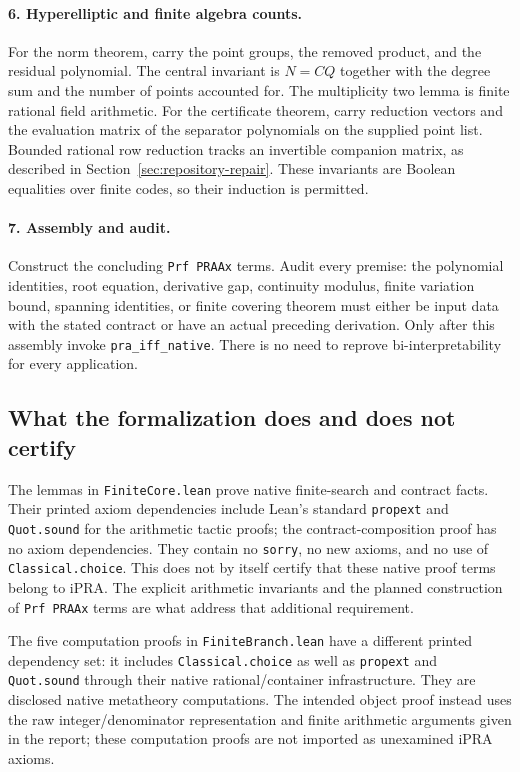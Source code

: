 \paragraph{6. Hyperelliptic and finite algebra counts.}
For the norm theorem, carry the point groups, the removed product, and
the residual polynomial. The central invariant is $N=CQ$ together with
the degree sum and the number of points accounted for. The multiplicity
two lemma is finite rational field arithmetic. For the certificate
theorem, carry reduction vectors and the evaluation matrix of the
separator polynomials on the supplied point list. Bounded rational row
reduction tracks an invertible companion matrix, as described in
Section~\ref{sec:repository-repair}. These invariants are Boolean
equalities over finite codes, so their induction is permitted.

\paragraph{7. Assembly and audit.}
Construct the concluding \texttt{Prf PRAAx} terms. Audit every premise:
the polynomial identities, root equation, derivative gap, continuity
modulus, finite variation bound, spanning identities, or finite covering
theorem must either be input data with the stated contract or have an
actual preceding derivation. Only after this assembly invoke
\texttt{pra\_iff\_native}. There is no need to reprove bi-interpretability
for every application.

\subsection{What the formalization does and does not certify}

The lemmas in \texttt{FiniteCore.lean} prove native finite-search and contract
facts. Their printed axiom dependencies include Lean's standard
\texttt{propext} and \texttt{Quot.sound} for the arithmetic tactic
proofs; the contract-composition proof has no axiom dependencies.
They contain no \texttt{sorry}, no new axioms, and no use of
\texttt{Classical.choice}. This does not by itself certify that these
native proof terms belong to iPRA. The explicit arithmetic invariants
and the planned construction of \texttt{Prf PRAAx} terms are what address
that additional requirement.

The five computation proofs in \texttt{FiniteBranch.lean} have a
different printed dependency set: it includes \texttt{Classical.choice}
as well as \texttt{propext} and \texttt{Quot.sound} through their
native rational/container infrastructure. They are disclosed native
metatheory computations. The intended object proof instead uses the
raw integer/denominator representation and finite arithmetic arguments
given in the report; these computation proofs are not imported as
unexamined iPRA axioms.

